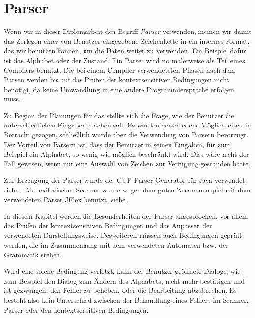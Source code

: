



\chapter{Parser}\label{Parser}

Wenn wir in dieser Diplomarbeit den Begriff \textit{Parser} verwenden, meinen wir
damit das Zerlegen einer von Benutzer eingegebene Zeichenkette in ein internes
Format, das wir benutzen können, um die Daten weiter zu verwenden. Ein Beispiel
dafür ist das Alphabet oder der Zustand. Ein Parser wird normalerweise als Teil
eines Compilers benutzt. Die bei einem Compiler verwendeteten Phasen nach dem
Parsen werden bis auf das Prüfen der kontextsensitiven Bedingungen nicht
benötigt, da keine Umwandlung in eine andere Programmiersprache erfolgen
muss.\vspace{10pt}

Zu Beginn der Planungen für das \gtitool stellte sich die Frage, wie der Benutzer
die unterschiedlichen Eingaben machen soll. Es wurden verschiedene
Möglichkeiten in Betracht gezogen, schließlich wurde aber die Verwendung von
Parsern bevorzugt. Der Vorteil von Parsern ist, dass der Benutzer in seinen
Eingaben, für zum Beispiel ein Alphabet, so wenig wie möglich beschränkt wird.
Dies wäre nicht der Fall gewesen, wenn nur eine Auswahl von Zeichen zur
Verfügung gestanden hätte.\vspace{10pt}

Zur Erzeugung der Parser wurde der CUP Parser-Generator für Java verwendet, siehe
\cite{java-cup}. Als lexikalischer Scanner wurde wegen dem guten Zusammenspiel
mit dem verwendeten Parser JFlex benutzt, siehe \cite{jflex}.\vspace{10pt}

In diesem Kapitel werden die Besonderheiten der Parser angesprochen, vor allem
das Prüfen der kontextsensitiven Bedingungen und das Anpassen der verwendeten
Darstellungsweise. Desweiteren müssen auch Bedingungen geprüft werden, die im
Zusammenhang mit dem verwendeten Automaten bzw. der Grammatik
stehen.\vspace{10pt}

Wird eine solche Bedingung verletzt, kann der Benutzer geöffnete Dialoge, wie zum
Beispiel den Dialog zum Ändern des Alphabets, nicht mehr bestätigen und ist
gezwungen, den Fehler zu beheben, oder die Bearbeitung abzubrechen. Es besteht
also kein Unterschied zwischen der Behandlung eines Fehlers im Scanner, Parser
oder den kontextsensitiven Bedingungen.\vspace{10pt}


